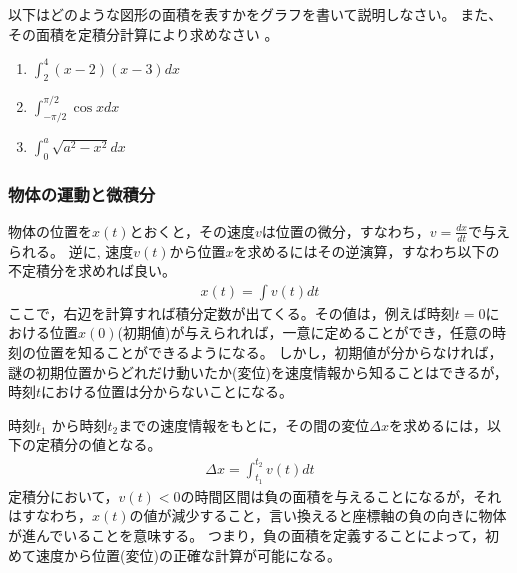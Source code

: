 \documentclass[twocolumn,11pt]{jarticle}
\begin{document}
\nexercise
以下はどのような図形の面積を表すかをグラフを書いて説明しなさい。
また、その面積を定積分計算により求めなさい
。
\begin{enumerate}
\item\label{iitem:int_2^4(x-2)(x-3)dx} $\displaystyle\int_2^4(x-2)(x-3) dx$
\item\label{iitem:int_(-pi/2)^(pi/2)cos xdx}
  $\displaystyle\int_{-\pi/2}^{\pi/2}\cos x dx$
\item\label{iitem:int_0^asqrt(a^2-x^2)dx} $\displaystyle\int_0^a \sqrt{a^2-x^2}dx$
\end{enumerate}

\subsubsection{物体の運動と微積分}
物体の位置を$x(t)$とおくと，その速度$v$は位置の微分，すなわち，$v=\frac{dx}{dt}$で与えられる。
逆に, 速度$v(t)$から位置$x$を求めるにはその逆演算，すなわち以下の不定積分を求めれば良い。
\begin{align*}
x(t)=\int v(t)dt
\end{align*}
ここで，右辺を計算すれば積分定数が出てくる。その値は，例えば時刻$t=0$における位置$x(0)$(初期値)が与えられれば，一意に定めることができ，任意の時刻の位置を知ることができるようになる。
しかし，初期値が分からなければ，謎の初期位置からどれだけ動いたか(変位)を速度情報から知ることはできるが，時刻$t$における位置は分からないことになる。

時刻$t_1$ から時刻$t_2$までの速度情報をもとに，その間の変位$\Delta x$を求めるには，以下の定積分の値となる。
\begin{align*}
  \Delta x=\int_{t_1}^{t_2}v(t)dt
\end{align*}
定積分において，$v(t)<0$の時間区間は負の面積を与えることになるが，それはすなわち，$x(t)$の値が減少すること，言い換えると座標軸の負の向きに物体が進んでいることを意味する。
つまり，負の面積を定義することによって，初めて速度から位置(変位)の正確な計算が可能になる。
\end{document}
